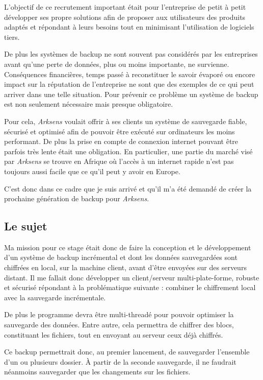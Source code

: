 \documentclass[a4paper,10pt, twoside]{report}
\begin{document}
\begin{spacing}{1.2}
L'objectif de ce recrutement important \'etait pour l'entreprise de petit \`a
petit d\'evelopper ses propre solutions afin de proposer aux utilisateurs des
produits adapt\'es et r\'epondant \`a leurs besoins tout en minimisant
l'utilisation de logiciels tiers.

De plus les syst\`emes de backup ne sont souvent pas consid\'er\'es par les
entreprises avant qu'une perte de donn\'ees, plus ou moins importante,
ne survienne. Cons\'equences financi\`eres, temps pass\'e \`a reconstituer le
savoir \'evapor\'e ou encore impact sur la r\'eputation de l'entreprise ne sont
que des exemples de ce qui peut arriver dans une telle situation. Pour
pr\'evenir ce probl\`eme un syst\`eme de backup est non seulement n\'ecessaire
mais presque obligatoire.

Pour cela, \textit{Arksens} voulait offrir \`a ses clients un syst\`eme de
sauvegarde fiable, s\'ecuris\'e et optimis\'e afin de pouvoir \^etre
ex\'ecut\'e sur ordinateurs les moins performant. De plus la prise en compte de
connexion internet pouvant \^etre parfois tr\`es lente \'etait une
obligation. En particulier, une partie du march\'e vis\'e par \textit{Arksens}
se trouve en Afrique o\`u l'acc\`es \`a un internet rapide n'est pas toujours
aussi facile que ce qu'il peut y avoir en Europe.

C'est donc dans ce cadre que je suis arriv\'e et qu'il m'a \'et\'e demand\'e
de cr\'eer la prochaine g\'en\'eration de backup pour \textit{Arksens}.

\subsection{Le sujet}
Ma mission pour ce stage \'etait donc de faire la conception et le
d\'eveloppement d'un syst\`eme de backup incr\'emental et dont les donn\'ees
sauvegard\'ees sont chiffr\'ees en local, sur la machine client, avant d'\^etre
envoy\'ees sur des serveurs distant. Il me fallait donc d\'evelopper un
client/serveur multi-plate-forme, robuste et s\'ecuris\'e r\'epondant \`a
la probl\'ematique suivante : combiner le chiffrement local avec la sauvegarde
incr\'ementale.

De plus le programme devra \^etre multi-thread\'e pour pouvoir optimiser la
sauvegarde des donn\'ees. Entre autre, cela permettra de chiffrer des blocs,
constituant les fichiers, tout en envoyant au serveur ceux d\'ej\`a chiffr\'es.

Ce backup permettrait donc, au premier lancement, de sauvegarder l'ensemble
d'un ou plusieurs dossier. \`A partir de la seconde sauvegarde, il ne faudrait
n\'eanmoins sauvegarder que les changements sur les fichiers.


\end{spacing}
\end{document}
